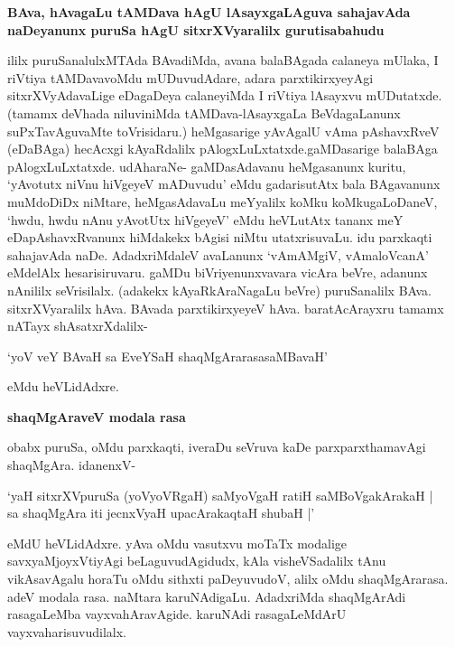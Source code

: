 {\bigskip
\noindent
{\large\bf BAva, hAvagaLu tAMDava hAgU lAsayxgaLAguva sahajavAda naDeyanunx puruSa hAgU sitxrXVya\-ralilx gurutisabahudu}}\label{page226}
\medskip

\noindent
ililx puruSanalulxMTAda BAvadiMda, avana balaBAgada calaneya mUlaka, I riVtiya tAMDava\-voMdu mUDuvudAdare, adara parxtikirxyeyAgi sitxrXVyAdavaLige eDagaDeya calaneyiMda I riVtiya lAsayxvu mUDutatxde. (tamamx deVhada niluvi\-niMda tAMDava-lAsayxgaLa BeVdagaLanunx suPxTavAguvaMte toVrisidaru.) heMgasarige yAvAgalU vAma pAshavxRveV (eDaBAga) hecAcxgi kAyaRdalilx pAlogxLuLx\-tatxde.\break gaMDasarige balaBAga pAlogxLuLx\-tatxde. udAharaNe- gaMDasAdavanu heMgasanunx \hbox{kuritu}, `yAvotutx niVnu hiVgeyeV mADuvudu' eMdu gadarisutAtx bala BAga\-vanunx muMdoDiDx niMtare, heMgasAdavaLu meYyalilx koMku koMkugaLoDaneV, `hwdu, hwdu nAnu yAvotUtx hiVgeyeV' eMdu heVLutAtx tananx meY eDapAshavxRvanunx hiMdakekx bAgisi niMtu utatxrisuvaLu. idu parxkaqti sahajavAda naDe. AdadxriMdaleV avaLanunx `vAmAMgiV, vAmaloVcanA' eMdelAlx hesarisiruvaru. gaMDu biVriyenunxvavara vicAra beVre, adanunx nAnililx seVrisilalx. (adakekx kAyaR\-kAraNagaLu beVre) puruSanalilx BAva. sitxrXVyaralilx hAva. BAvada parxtikirxyeyeV hAva. baratAcArayxru tamamx nATayx shAsatxrXdalilx-

\begin{shloka} 
`yoV veY BAvaH sa EveYSaH shaqMgArarasasaMBavaH'\label{227}
\end{shloka}

eMdu heVLidAdxre.

{\bigskip
\noindent
{\large\bf shaqMgAraveV modala rasa}}\label{page227}
\medskip

\noindent
obabx puruSa, oMdu parxkaqti, iveraDu seVruva kaDe parxparxthamavAgi shaqMgAra. idanenxV-

\begin{shloka}
`yaH sitxrXVpuruSa (yoVyoVRgaH) saMyoVgaH ratiH saMBoVgakArakaH |\\\label{227}
sa shaqMgAra iti jecnxVyaH upacArakaqtaH shubaH |'
\end{shloka}

\noindent
eMdU heVLidAdxre. yAva oMdu vasutxvu moTaTx modalige savxyaMjoyxVti\-yAgi beLaguvudAgidudx, kAla visheVSadalilx tAnu vikAsavAgalu horaTu oMdu sithxti paDeyuvudoV, alilx oMdu shaqMgAra\-rasa. adeV modala rasa. naMtara karuNAdigaLu. AdadxriMda shaqMgArAdi rasagaLeMba vayxvahAra\-vAgide. karuNAdi rasagaLeMdArU vayxvaharisuvudilalx.

\eject

